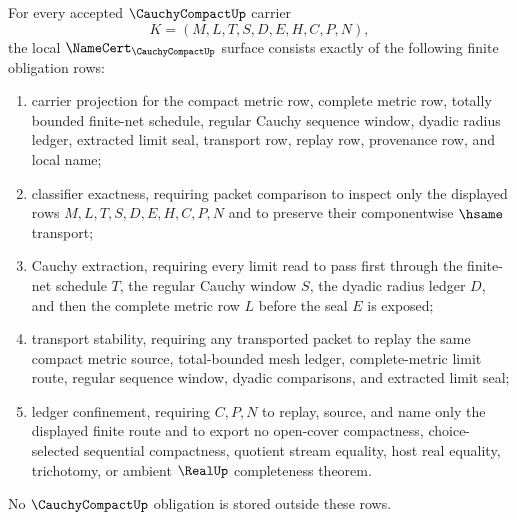 \begin{theorem}
\label{thm:cauchy-compact-namecert-obligations}
For every accepted $\CauchyCompactUp$ carrier
$$
K=(M,L,T,S,D,E,H,C,P,N),
$$
the local $\NameCert_{\CauchyCompactUp}$ surface consists exactly of the following finite obligation rows:
\begin{enumerate}
\item carrier projection for the compact metric row, complete metric row, totally bounded finite-net schedule, regular Cauchy sequence window, dyadic radius ledger, extracted limit seal, transport row, replay row, provenance row, and local name;
\item classifier exactness, requiring packet comparison to inspect only the displayed rows $M,L,T,S,D,E,H,C,P,N$ and to preserve their componentwise $\hsame$ transport;
\item Cauchy extraction, requiring every limit read to pass first through the finite-net schedule $T$, the regular Cauchy window $S$, the dyadic radius ledger $D$, and then the complete metric row $L$ before the seal $E$ is exposed;
\item transport stability, requiring any transported packet to replay the same compact metric source, total-bounded mesh ledger, complete-metric limit route, regular sequence window, dyadic comparisons, and extracted limit seal;
\item ledger confinement, requiring $C,P,N$ to replay, source, and name only the displayed finite route and to export no open-cover compactness, choice-selected sequential compactness, quotient stream equality, host real equality, trichotomy, or ambient $\RealUp$ completeness theorem.
\end{enumerate}
No $\CauchyCompactUp$ obligation is stored outside these rows.
\end{theorem}

